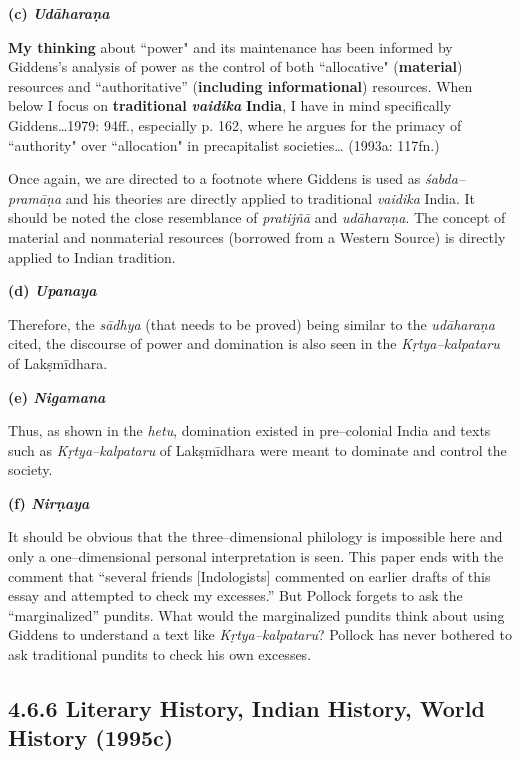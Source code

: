 \textbf{(c) \textit{Udāharaṇa}}

\begin{myquote}
\textbf{My thinking} about ``power" and its maintenance has been informed by Giddens's analysis of power as the control of both ``allocative" (\textbf{material}) resources and ``authoritative'' (\textbf{including informational}) resources. When below I focus on \textbf{traditional }\textit{\textbf{vaidika }}\textbf{India}, I have in mind specifically Giddens…1979: 94ff., especially p. 162, where he argues for the primacy of ``authority" over ``allocation" in precapitalist societies… (1993a: 117fn.)
\end{myquote}

Once again, we are directed to a footnote where Giddens is used as \textit{śabda–pramāṇa} and his theories are directly applied to traditional \textit{vaidika} India. It should be noted the close resemblance of \textit{pratijñā} and \textit{udāharaṇa}. The concept of material and nonmaterial resources (borrowed from a Western Source) is directly applied to Indian tradition.

\textbf{(d) \textit{Upanaya}}

Therefore, the \textit{sādhya} (that needs to be proved) being similar to the \textit{udāharaṇa} cited, the discourse of power and domination is also seen in the \textit{Kṛtya–kalpataru} of Lakṣmīdhara.


\textbf{(e) \textit{Nigamana}}

Thus, as shown in the \textit{hetu}, domination existed in pre–colonial India and texts such as \textit{Kṛtya–kalpataru }of Lakṣmīdhara were meant to dominate and control the society.

\textbf{(f) \textit{Nirṇaya}}

It should be obvious that the three–dimensional philology is impossible here and only a one–dimensional personal interpretation is seen. This paper ends with the comment that “several friends [Indologists] commented on earlier drafts of this essay and attempted to check my excesses.” But Pollock forgets to ask the “marginalized” pundits. What would the marginalized pundits think about using Giddens to understand a text like \textit{Kṛtya–kalpataru}? Pollock has never bothered to ask traditional pundits to check his own excesses.

\vspace{-.3cm}

\subsection*{4.6.6 Literary History, Indian History, World History (1995c)}

